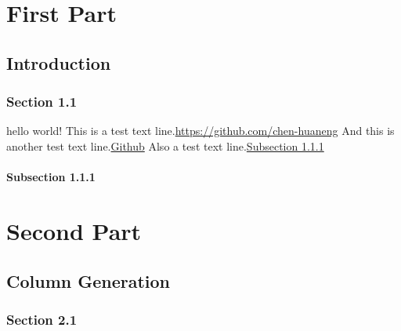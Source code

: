 \documentclass{note}
\begin{document}
% 
% 
% 
% 
% 
% 

\part{First Part}

\chapter{Introduction}

\section{Section 1.1}

hello world!\cite{2015The} This is a test text line.\url{https://github.com/chen-huaneng} And this is another test text line.\href{https://github.com/chen-huaneng}{Github} Also a test text line.\hyperref[test]{Subsection 1.1.1}

\lipsum[5-10]

\subsection{Subsection 1.1.1}\label{test}

\lipsum[5-10]

\part{Second Part}

\chapter{Column Generation}

\lipsum[5-10]

\section{Section 2.1}

\lipsum[5-10]

\backmatter

% 

\end{document}
